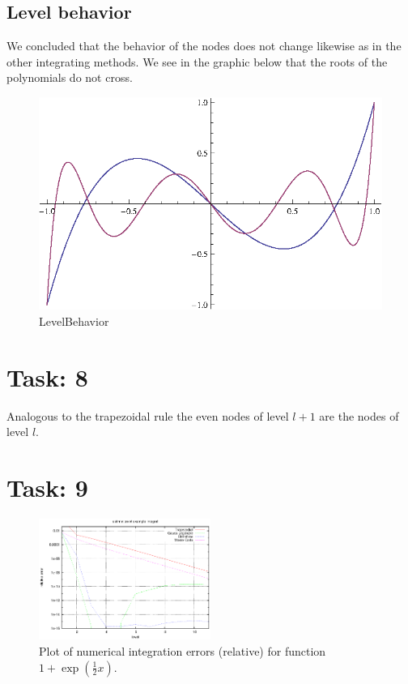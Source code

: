 \documentclass{article}
\begin{document}
\subsection*{Level behavior}
We concluded that the behavior of the nodes does not change likewise as in the other integrating methods. We see in the graphic below that the roots of the polynomials do not cross.
\begin{figure}[htbp]
  \centering
    \includegraphics[width=1.00\textwidth]{../Task07/LevelBehavior.eps}
  \caption{LevelBehavior}
  \label{fig:LevelBehavior}
\end{figure}

\section*{Task: 8}

Analogous to the trapezoidal rule the even nodes of level $l+1$ are the nodes of level $l$.

\section*{Task: 9}

\begin{figure}[htbp]
  \centering
    \includegraphics[width=0.50\textwidth]{../Task09/task9_convergence_plot.eps}
  \caption{Plot of numerical integration errors (relative) for function $1+\exp\left(\frac{1}{2}x\right)$.}
\end{figure}
\end{document}
